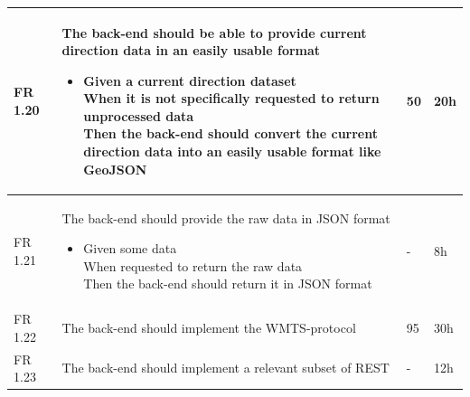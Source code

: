 \documentclass[11pt,a4paper,titlepage,oneside]{report}
\begin{document}
\begin{longtable}{p{1.4cm} p{7.8cm} p{1cm} p{1cm} }
  FR 1.20 & The back-end should be able to provide current direction data in an easily usable format
  \begin{itemize}
  \item \parbox[t]{6.8cm}{
        Given a current direction dataset \\
        When it is not specifically requested to return unprocessed data \\
        Then the back-end should convert the current direction data into an easily usable format like GeoJSON}
  \end{itemize}
  & 50 & 20h \\ \hline

  FR 1.21 & The back-end should provide the raw data in JSON format
  \begin{itemize}
  \item \parbox[t]{6.8cm}{
        Given some data \\
        When requested to return the raw data \\
        Then the back-end should return it in JSON format}
  \end{itemize}
  & - & 8h \\ \hline

  FR 1.22 & The back-end should implement the WMTS-protocol & 95 & 30h \\ \hline

  FR 1.23 & The back-end should implement a relevant subset of REST & - & 12h \\ \hline
  \end{longtable}
  
  \vspace{2cm}
\end{document}

